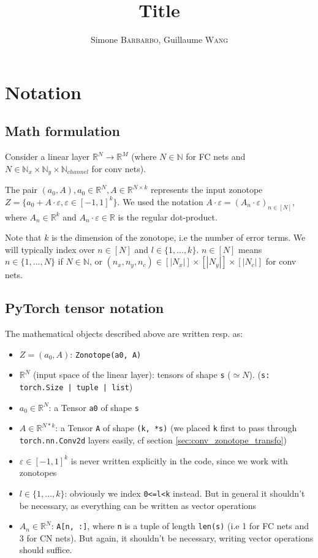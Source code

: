 \documentclass{article}
\title{Title}
\author{Simone \textsc{Barbarbo}, Guillaume \textsc{Wang}}
\newcommand{\code}[1]{\texttt{#1}}
\newcommand{\RR}{\mathbb{R}}
\newcommand{\NN}{\mathbb{N}}
\newcommand{\eps}{\varepsilon}
\begin{document}

\section{Notation}

\subsection{Math formulation}

Consider a linear layer $\RR^N \to \RR^M$ (where $N \in \NN$ for FC nets and $N \in \NN_x \times \NN_y \times \NN_{channel}$ for conv nets).

The pair $(a_0, A), a_0 \in \RR^N, A \in \RR^{N \times k}$ represents the input zonotope $Z = \{ a_0 + A \cdot \eps, \eps \in [-1, 1]^k \}$. We used the notation $A \cdot \eps = (A_n \cdot \eps)_{n \in [N]}$, where $A_n \in \RR^k$ and $A_n \cdot \eps \in \RR$ is the regular dot-product.

Note that $k$ is the dimension of the zonotope, i.e the number of error terms. We will typically index over $n \in [N]$ and $l \in \{1,..., k\}$. 
$n \in [N]$ means $n \in \{1,...,N\}$ if $N \in \NN$, or $(n_x, n_y, n_c) \in [|N_x|] \times [|N_y|] \times [|N_c|]$ for conv nets.

\subsection{PyTorch tensor notation}

The mathematical objects described above are written resp. as:
\begin{itemize}
    \item $Z = (a_0, A)$: \code{Zonotope(a0, A)}
    \item $\RR^N$ (input space of the linear layer): tensors of shape \code{s} ($\simeq N$). (\code{s: torch.Size | tuple | list})
    \item $a_0 \in \RR^N$: a Tensor \code{a0} of shape \code{s}
    \item $A \in \RR^{N*k}$: a Tensor \code{A} of shape \code{(k, *s)} (we placed \code{k} first to pass through \code{torch.nn.Conv2d} layers easily, cf section \ref{sec:conv_zonotope_transfo})
    \item $\eps \in [-1, 1]^k$ is never written explicitly in the code, since we work with zonotopes
    \item $l \in \{1,...,k\}$: obviously we index \code{0<=l<k} instead. But in general it shouldn't be necessary, as everything can be written as vector operations
    \item $A_n \in \RR^N$: \code{A[n, :]}, where \code{n} is a tuple of length \code{len(s)} (i.e 1 for FC nets and 3 for CN nets). But again, it shouldn't be necessary, writing vector operations should suffice.
\end{itemize}
\end{document}
